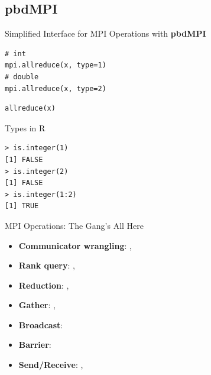 \subsection{pbdMPI}

\begin{frame}[fragile]
  \begin{block}{Simplified Interface for MPI Operations with \textbf{pbdMPI}}\pause
    \begin{minipage}[t]{.475\textwidth}
      \begin{lstlisting}[title=Rmpi]
# int
mpi.allreduce(x, type=1)
# double
mpi.allreduce(x, type=2)
     \end{lstlisting}
   \end{minipage}
   \hfill
   \begin{minipage}[t]{.475\textwidth}
     \begin{lstlisting}[title=pbdMPI]
allreduce(x)
     \end{lstlisting}
     \vspace{1em}
     \hspace{1em}{\small S4. Batch only! (No spawning)}
   \end{minipage}
 \end{block}
%
 \begin{block}{Types in R}
   \vspace{-.2cm}
   \begin{lstlisting}
> is.integer(1)
[1] FALSE
> is.integer(2)
[1] FALSE
> is.integer(1:2)
[1] TRUE
   \end{lstlisting}
 \end{block}
\end{frame}

\begin{frame}
  \begin{block}{MPI Operations: The Gang's All Here}\pause
    \begin{itemize}
      \item \textbf{Communicator wrangling}: {\color{blue},   
}\\[.4cm]
      \item \textbf{Rank query}: {\color{blue}, }\\[.4cm]
      \item \textbf{Reduction}: ,     
{\color{blue}}\\[.4cm]
      \item \textbf{Gather}: , {\color{blue}}\\[.4cm]
      \item \textbf{Broadcast}: \\[.4cm]
      \item \textbf{Barrier}: \\[.4cm]
      \item \textbf{Send/Receive}: , 
    \end{itemize}
  \end{block}
\end{frame}


